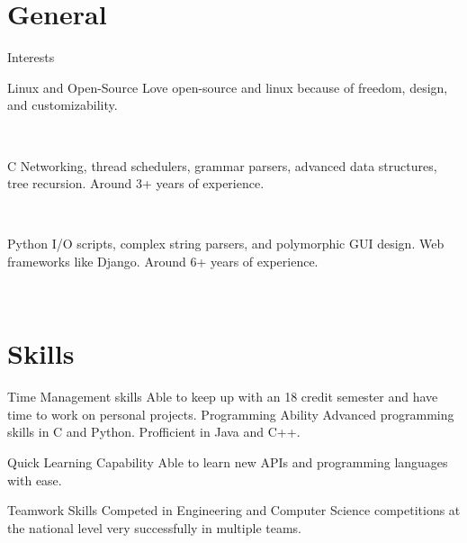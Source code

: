 \documentclass[]{alternate}
\begin{document}

\section{General}{Interests}

\vspace{-0.3cm}
\begin{entrylist}
\entry
{}
{Linux and Open-Source}
{}
{Love open-source and linux because of freedom, design, and customizability.}

\end{entrylist}\
\begin{entrylist}
\entry
{}
{C}
{}
{Networking, thread schedulers, grammar parsers, advanced data structures, tree recursion. Around 3+ years of experience.}
\end{entrylist}\
\begin{entrylist}
\entry
{}
{Python}
{}
{I/O scripts, complex string parsers, and polymorphic GUI design. Web frameworks like Django. Around 6+ years of experience.}

\end{entrylist}\

\section{Skills}{}

\vspace{-0.2cm}

\begin{entrylist}
\entry
  {}
  {Time Management skills}
  {}
  {Able to keep up with an 18 credit semester and have time to work on personal projects.}
\entry
  {}
  {Programming Ability }
  {}
  {Advanced programming skills in C and Python. Profficient in Java and C++.}
  
  \entry
  {}
  {Quick Learning Capability}
  {}
  {Able to learn new APIs and programming languages with ease.}
  
  \entry
  {}
  {Teamwork Skills}
  {}
  {Competed in Engineering and Computer Science competitions at the national level very successfully in multiple teams.}

  

\end{entrylist}


\end{document}
